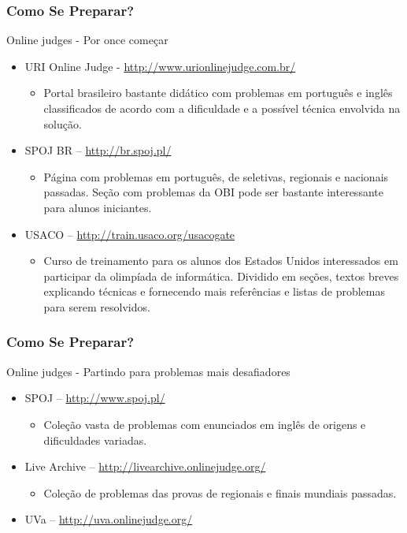 \begin{frame}
\frametitle{Como Se Preparar?}
\begin{block}{Online judges - Por once começar}
\begin{itemize}
	\item URI Online Judge - \url{http://www.urionlinejudge.com.br/}
	\begin{itemize}
		\item Portal brasileiro bastante didático com problemas em português e inglês classificados de acordo com a dificuldade e a possível técnica envolvida na solução.
	\end{itemize}
	\item SPOJ BR  -- \url{http://br.spoj.pl/}
		\begin{itemize}
		\item Página com problemas em português, de seletivas, regionais e nacionais passadas. Seção com problemas da OBI pode ser bastante interessante para alunos iniciantes.
	\end{itemize}
	\item USACO -- \url{http://train.usaco.org/usacogate}
	\begin{itemize}
		\item Curso de treinamento para os alunos dos Estados Unidos interessados em participar da olimpíada de informática. Dividido em seções, textos breves explicando técnicas e fornecendo mais referências e listas de problemas para serem resolvidos.
	\end{itemize}
\end{itemize}
\end{block}
\end{frame}

\begin{frame}
\frametitle{Como Se Preparar?}
\begin{block}{Online judges - Partindo para problemas mais desafiadores}
\begin{itemize}
	\item SPOJ -- \url{http://www.spoj.pl/}	
	\begin{itemize}
		\item Coleção vasta de problemas com enunciados em inglês de origens e dificuldades variadas.
	\end{itemize}
	\item Live Archive -- \url{http://livearchive.onlinejudge.org/}
	\begin{itemize}
		\item Coleção de problemas das provas de regionais e finais mundiais passadas.
	\end{itemize}
	\item UVa -- \url{http://uva.onlinejudge.org/}
\end{itemize}
\end{block}
\end{frame}

